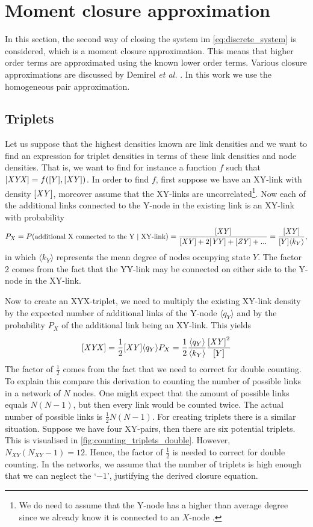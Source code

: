 \section{Moment closure approximation}

In this section, the second way of closing the system im \cref{eq:discrete_system} is considered, which is a moment closure approximation. This means that higher order terms are approximated using the known lower order terms. Various closure approximations are discussed by Demirel \textit{et al.} \cite{Demirel2014}. In this work we use the homogeneous pair approximation.

\subsection{Triplets}

Let us suppose that the highest densities known are link densities and we want to find an expression for triplet densities in terms of these link densities and node densities. That is, we want to find for instance a function $f$ such that $\mathit{[XYX]} = f([Y], \mathit{[XY]})$. In order to find $f$, first suppose we have an XY-link with density $\mathit{[XY]}$, moreover assume that the XY-links are uncorrelated\footnote{We do need to assume that the Y-node has a higher than average degree since we already know it is connected to an $X$-node \cite{Demirel2014}.}. Now each of the additional links connected to the Y-node in the existing link is an XY-link with probability 
\begin{equation}\small
	P_{X}=P(\text{additional X connected to the Y | XY-link})=\frac{\mathit{[XY]}}{\mathit{[XY]} + 2\mathit{[YY]} + \mathit{[ZY]} + ...}=\frac{\mathit{[XY]}}{[Y] \langle k_Y \rangle},
\end{equation}\normalsize
in which $\langle k_Y \rangle$ represents the mean degree of nodes occupying state $Y$. The factor 2 comes from the fact that the YY-link may be connected on either side to the Y-node in the XY-link. 

Now to create an XYX-triplet, we need to multiply the existing XY-link density by the expected number of additional links of the Y-node $\langle q_Y \rangle$ and by the probability $P_{X}$ of the additional link being an XY-link. This yields
\begin{equation}
	\mathit{[XYX]} = \frac{1}{2} \mathit{[XY]} \langle q_Y \rangle P_{X} = \frac{1}{2} \frac{\langle q_Y \rangle}{\langle k_Y \rangle} \frac{\mathit{[XY]}^2}{[Y]}
\end{equation}
The factor of $\frac{1}{2}$ comes from the fact that we need to correct for double counting. To explain this compare this derivation to counting the number of possible links in a network of $N$ nodes. One might expect that the amount of possible links equals $N(N-1)$, but then every link would be counted twice. The actual number of possible links is $\frac{1}{2}N(N-1)$. For creating triplets there is a similar situation. Suppose we have four XY-pairs, then there are six potential triplets. This is visualised in \cref{fig:counting_triplets_double}. However, $N_{XY}(N_{XY}-1) = 12$. Hence, the factor of $\frac{1}{2}$ is needed to correct for double counting. In the networks, we assume that the number of triplets is high enough that we can neglect the `$-1$', justifying the derived closure equation.

